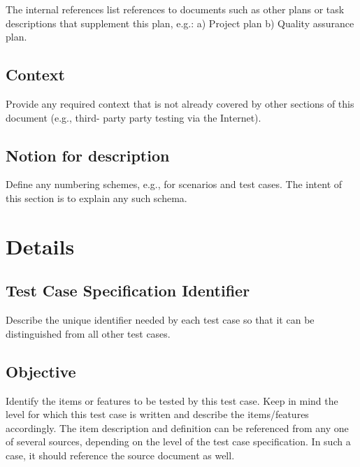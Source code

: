 \documentclass{./template/openetcs_report}
\begin{document}
The internal references list references to documents
such as other plans or task descriptions that supplement this plan, e.g.: a)
Project plan b) Quality assurance plan.


\subsection{Context}
Provide any required context that is not already covered by other sections of
this document (e.g., third- party party testing via the Internet).

\subsection{Notion for description}
Define any numbering schemes, e.g., for scenarios and test cases. The intent of
this section is to explain any such schema.


\section{Details}
\subsection{Test Case Specification Identifier}
Describe the unique identifier needed by each test case so that it can be
distinguished from all other test cases.


\subsection{Objective}

Identify the items or features to be tested by this test case. 
Keep in mind the level for which this test case is written and describe the
items/features accordingly. 
The item description and definition can be referenced from any one
of several sources, depending on the level of the test case specification.
In such a case, it should reference the source document as well.

\end{document}
